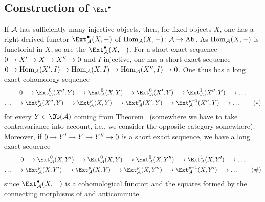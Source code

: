 \documentclass[a4paper,parskip=half,numbers=enddot, DIV=12]{scrreprt}
\begin{document}
\subsection{Construction of \texorpdfstring{$\Ext^\bullet$}{Ext}}
If $\mathcal{A}$ has sufficiently many injective objects, then, for fixed objects $X$, one has a right-derived functor $\Ext_\Aa^\bullet(X,-)$ of $\Hom_\Aa(X,-)\colon \Aa\morphism\cat{Ab}$. As $\operatorname{Hom}_{\mathcal{A}}(X,-)$ is functorial in $X$, so are the $\Ext_\Aa^\bullet(X,-)$. For a short exact sequence $0\morphism X'\morphism X\morphism X''\morphism 0$ and $I$ injective, one has a short exact sequence $0\morphism\Hom_\Aa(X',I)\morphism\Hom_\Aa(X,I)\morphism\Hom_\Aa(X'',I)\morphism 0$. One thus has a long exact cohomology sequence
\begin{multline}\lbl{eq:ExtSeq1}
	0\morphism\Ext_\Aa^0(X'',Y)\morphism\Ext_\Aa^0(X,Y)\morphism\Ext_\Aa^0(X',Y)\morphism\Ext_\Aa^1(X'',Y)\morphism\ldots\\
	\ldots\morphism\Ext_\Aa^p(X'',Y)\morphism\Ext_\Aa^p(X,Y)\morphism\Ext_\Aa^p(X',Y)\morphism\Ext_\Aa^{p+1}(X'',Y)\morphism\ldots\tag{$*$}
\end{multline}
for every $Y\in\Ob(\Aa)$ coming from Theorem~ (somewhere we have to take contravariance into account, i.e., we consider the opposite category somewhere). Moreover, if $0\morphism Y'\morphism Y\morphism Y''\morphism 0$ is  a short exact sequence, we have a long exact sequence
\begin{multline}\lbl{eq:ExtSeq2}
0\morphism\Ext_\Aa^0(X,Y')\morphism\Ext_\Aa^0(X,Y)\morphism\Ext_\Aa^0(X,Y'')\morphism\Ext_\Aa^1(X,Y')\morphism\ldots\\
\ldots\morphism\Ext_\Aa^p(X,Y')\morphism\Ext_\Aa^p(X,Y)\morphism\Ext_\Aa^p(X,Y'')\morphism\Ext_\Aa^{p+1}(X,Y')\morphism\ldots\tag{\#}
\end{multline}
since $\Ext_\Aa^\bullet(X,-)$ is a cohomological functor; and the squares formed by the connecting morphisms of   and  anticommute.
\end{document}
